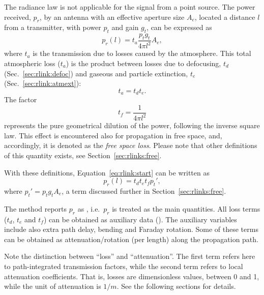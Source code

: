 The radiance law is not applicable for the signal from a point source.
The power received, $p_r$, by an antenna with an effective aperture size
$A_e$, located a distance $l$ from a transmitter, with power
$p_t$ and gain $g_t$, can be expressed as \citet[e.g.][]{ippolito:satco:08}
\begin{equation}
  \label{eq:rlink:start}
  p_r(l) = t_a\frac{p_tg_t}{4\pi l^2}A_e,
\end{equation}
where $t_a$ is the transmission due to losses caused by the atmosphere. This
total atmospheric loss ($t_a$) is the product between losses due to defocusing,
$t_d$ (Sec.~\ref{sec:rlink:defoc}) and gaseous and particle extinction, $t_e$
(Sec.~\ref{sec:rlink:atmext}):
\begin{equation}
  t_a = t_d t_e.
\end{equation}
The factor
\begin{equation}
  \label{eq:rlink:fspl}
  t_f = \frac{1}{4\pi l^2}
\end{equation}
represents the pure geometrical dilution of the power, following the inverse
square law. This effect is encountered also for propagation in free space, and,
accordingly, it is denoted as the \emph{free space loss}. Please note that
other definitions of this quantity exists, see Section~\ref{sec:rlinks:free}.

With these definitions, Equation~\ref{eq:rlink:start} can be written as
\begin{equation}
  \label{eq:rlink:pr}
  p_r(l) = t_d t_e t_f p_t',
\end{equation}
where $p_t'=p_tg_tA_e$, a term discussed further in
Section~\ref{sec:rlinks:free}.

The method  reports $p_r$ as , i.e.\ $p_r$
is treated as the main quantities. All loss terms ($t_d$, $t_e$ and $t_f$) can
be obtained as auxiliary data (). The auxiliary variables
include also extra path delay, bending and Faraday rotation. Some of these
terms can be obtained as attenuation/rotation (per length) along the
propagation path. 

Note the distinction between ``loss'' and ``attenuation''. The first term
refers here to path-integrated transmission factors, while the second term
refers to local attenuation coefficients. That is, losses are dimensionless
values, between 0 and 1, while the unit of attenuation is $1/m$. See the
following sections for details.

